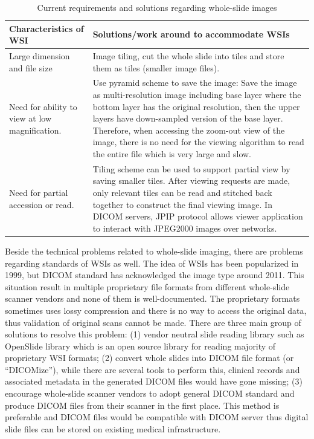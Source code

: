 \documentclass{article}
\begin{document}
\begin{table}
 \caption{Current requirements and solutions regarding whole-slide images}
  \centering
  \begin{tabular}{p{4cm} p{10cm}}
    \toprule
    \cmidrule(r){1-2}
    Characteristics of WSI     &  Solutions/work around to accommodate WSIs\\
    \midrule
    Large dimension and file size & Image tiling, cut the whole slide into tiles and store them as tiles (smaller image files).  \\
    Need for ability to view at low magnification. & Use pyramid scheme to save the image: Save the image as multi-resolution image including base layer where the bottom layer has the original resolution, then the upper layers have down-sampled version of the base layer. Therefore, when accessing the zoom-out view of the image, there is no need for the viewing algorithm to read the entire file which is very large and slow.  \\
    Need for partial accession or read.  & Tiling scheme can be used to support partial view by saving smaller tiles. After viewing requests are made, only relevant tiles can be read and stitched back together to construct the final viewing image. In DICOM servers, JPIP protocol allows viewer application to interact with JPEG2000 images over networks. \\ 
    \bottomrule
  \end{tabular}
  \label{tab:table1}
\end{table}

Beside the technical problems related to whole-slide imaging, there are problems regarding standards of WSIs as well. The idea of WSIs has been popularized in 1999, but DICOM standard has acknowledged the image type around 2011. This situation result in multiple proprietary file formats from different whole-slide scanner vendors and none of them is well-documented. The proprietary formats sometimes uses lossy compression and there is no way to access the original data, thus validation of original scans cannot be made. There are three main group of solutions to resolve this problem: (1) vendor neutral slide reading library such as OpenSlide library which is an open source library for reading majority of proprietary WSI formats; (2) convert whole slides into DICOM file format (or “DICOMize”), while there are several tools to perform this, clinical records and associated metadata in the generated DICOM files would have gone missing; (3) encourage whole-slide scanner vendors to adopt general DICOM standard and produce DICOM files from their scanner in the first place. This method is preferable and DICOM files would be compatible with DICOM server thus digital slide files can be stored on existing medical infrastructure. 
\end{document}
